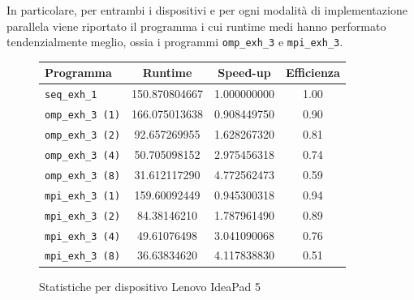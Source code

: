 \documentclass[12pt]{report}
\begin{document}
    In particolare, per entrambi i dispositivi e per ogni modalità di implementazione parallela viene riportato il programma i cui runtime medi hanno performato tendenzialmente meglio, ossia i programmi \texttt{omp\_exh\_3} e \texttt{mpi\_exh\_3}.

    \begin{figure}[H]
        \centering

        \begin{tabular}{ l | c | c | c }
            \textbf{Programma} & \textbf{Runtime} & \textbf{Speed-up} & \textbf{Efficienza}\\
            \hline
            \texttt{seq\_exh\_1} & 150.870804667 & 1.000000000 & 1.00 \\
            \hline
            \texttt{omp\_exh\_3 (1)} & 166.075013638 & 0.908449750 & 0.90 \\
            \texttt{omp\_exh\_3 (2)} & 92.657269955 & 1.628267320 & 0.81 \\
            \texttt{omp\_exh\_3 (4)} & 50.705098152 & 2.975456318 & 0.74 \\
            \texttt{omp\_exh\_3 (8)} & 31.612117290 & 4.772562473 & 0.59 \\
            \hline
            \texttt{mpi\_exh\_3 (1)} & 159.60092449 & 0.945300318 & 0.94 \\
            \texttt{mpi\_exh\_3 (2)} & 84.38146210 & 1.787961490 & 0.89 \\
            \texttt{mpi\_exh\_3 (4)} & 49.61076498 & 3.041090068 & 0.76 \\
            \texttt{mpi\_exh\_3 (8)} & 36.63834620 & 4.117838830 & 0.51 \\
        \end{tabular}
        \caption{Statistiche per dispositivo Lenovo IdeaPad 5}
        \label{fig:stats_ip5_1}
    \end{figure}
\end{document}
